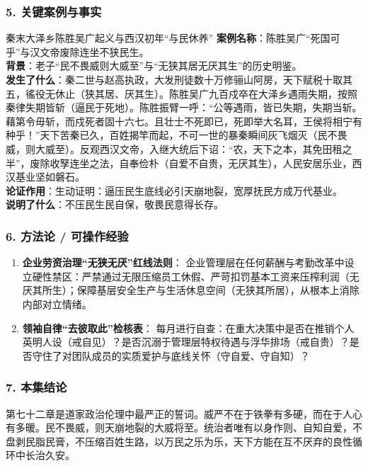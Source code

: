 \subsubsection{5. 关键案例与事实}
\begin{CaseBox}{秦末大泽乡陈胜吴广起义与西汉初年“与民休养”}
\textbf{案例名称}：陈胜吴广“死国可乎”与汉文帝废除连坐不狭民生。\\
\textbf{背景}：老子“民不畏威则大威至”与“无狭其居无厌其生”的历史明鉴。\\
\textbf{发生了什么}：秦二世与赵高执政，大发刑徒数十万修骊山阿房，天下赋税十取其五，徭役无休止（狭其居、厌其生）。陈胜吴广九百戍卒在大泽乡遇雨失期，按照秦律失期皆斩（逼民于死地）。陈胜振臂一呼：“公等遇雨，皆已失期，失期当斩。藉第令毋斩，而戍死者固十六七。且壮士不死即已，死即举大名耳，王侯将相宁有种乎！”天下苦秦已久，百姓揭竿而起，不可一世的暴秦瞬间灰飞烟灭（民不畏威，则大威至）。反观西汉文帝，入继大统后下诏：“农，天下之本，其免田租之半”，废除收孥连坐之法，自奉俭朴（自爱不自贵，无厌其生），人民安居乐业，西汉基业坚如磐石。\\
\textbf{论证作用}：生动证明：逼压民生底线必引天崩地裂，宽厚抚民方成万代基业。\\
\textbf{说明了什么}：不压民生民自保，敬畏民意得长存。
\end{CaseBox}

\subsubsection{6. 方法论 / 可操作经验}
\begin{enumerate}
    \item \textbf{企业劳资治理“无狭无厌”红线法则}：
    企业管理层在任何薪酬与考勤改革中设立硬性禁区：严禁通过无限压缩员工休假、严苛扣罚基本工资来压榨利润（无厌其所生）；保障基层安全生产与生活休息空间（无狭其所居），从根本上消除内部对立情绪。
    \item \textbf{领袖自律“去彼取此”检核表}：
    每月进行自查：在重大决策中是否在推销个人英明人设（戒自见）？是否沉溺于管理层特权待遇与浮华排场（戒自贵）？是否守住了对团队成员的实质爱护与底线关怀（守自爱、守自知）？
\end{enumerate}

\subsubsection{7. 本集结论}
第七十二章是道家政治伦理中最严正的誓词。威严不在于铁拳有多硬，而在于人心有多暖。民不畏威，则天崩地裂的大威将至。统治者唯有以身作则、自知自爱，不盘剥民脂民膏，不压缩百姓生路，以万民之乐为乐，天下方能在互不厌弃的良性循环中长治久安。

